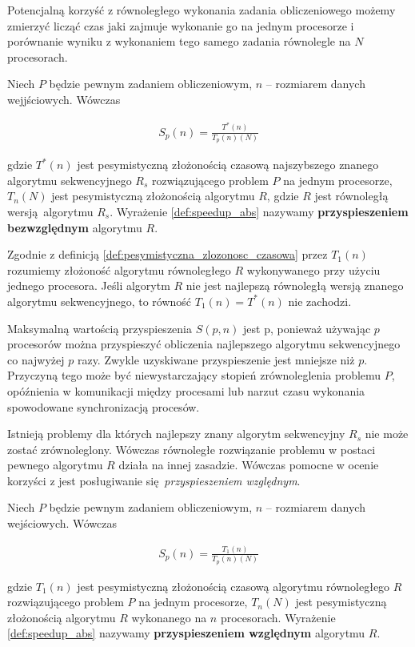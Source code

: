 Potencjalną korzyść z równoległego wykonania zadania obliczeniowego możemy zmierzyć licząć czas jaki zajmuje wykonanie go na jednym procesorze i porównanie wyniku z wykonaniem tego samego zadania równolegle na \(N\) procesorach. 

\begin{definicja}
Niech \(P\) będzie pewnym zadaniem obliczeniowym, \(n\) -- rozmiarem danych wejjściowych. Wówczas

\begin{align}\label{def:speedup_abs}
 S_{p}(n)=\frac{T^{*}(n)}{T_{p}(n)(N)}
\end{align}

gdzie \(T^{*}(n)\) jest pesymistyczną złożonością czasową najszybszego znanego algorytmu sekwencyjnego \(R_s\) rozwiązującego problem \(P\) na jednym procesorze, \(T_{n}(N)\) jest pesymistyczną złożonością algorytmu \(R\), gdzie \(R\) jest równoległą wersją algorytmu \(R_s\). Wyrażenie \ref{def:speedup_abs} nazywamy \textbf{przyspieszeniem bezwzględnym} algorytmu \(R\).
\end{definicja}


Zgodnie z definicją \ref{def:pesymistyczna_zlozonosc_czasowa} przez \(T_{1}(n)\) rozumiemy złożoność algorytmu równoległego \(R\) wykonywanego przy użyciu jednego procesora. Jeśli algorytm \(R\) nie jest najlepszą równoległą wersją znanego algorytmu sekwencyjnego, to równość \(T_{1}(n) = T^{*}(n)\) nie zachodzi.


Maksymalną wartością przyspieszenia \(S(p,n)\) jest p, ponieważ używając \(p\) procesorów można przyspieszyć obliczenia najlepszego algorytmu sekwencyjnego co najwyżej \(p\) razy. Zwykle uzyskiwane przyspieszenie jest mniejsze niż \(p\). Przyczyną tego może być niewystarczający stopień zrównoleglenia problemu \(P\), opóźnienia w komunikacji między procesami lub narzut czasu wykonania spowodowane synchronizacją procesów.


Istnieją problemy dla których najlepszy znany algorytm sekwencyjny \(R_s\) nie może zostać zrównoleglony. Wówczas równoległe rozwiązanie problemu w postaci pewnego algorytmu \(R\) działa na innej zasadzie. Wówczas pomocne w ocenie korzyści z jest posługiwanie się \emph{przyspieszeniem względnym}.

\begin{definicja}
Niech \(P\) będzie pewnym zadaniem obliczeniowym, \(n\) -- rozmiarem danych wejściowych. Wówczas

\begin{align}\label{def:speedup_rel}
 S_{p}(n)=\frac{T_{1}(n)}{T_{p}(n)(N)}
\end{align}

gdzie \(T_{1}(n)\) jest pesymistyczną złożonością czasową algorytmu równoległego \(R\) rozwiązującego problem \(P\) na jednym procesorze, \(T_{n}(N)\) jest pesymistyczną złożonością algorytmu \(R\) wykonanego na \(n\) procesorach. Wyrażenie \ref{def:speedup_abs} nazywamy \textbf{przyspieszeniem względnym} algorytmu \(R\).
\end{definicja}


